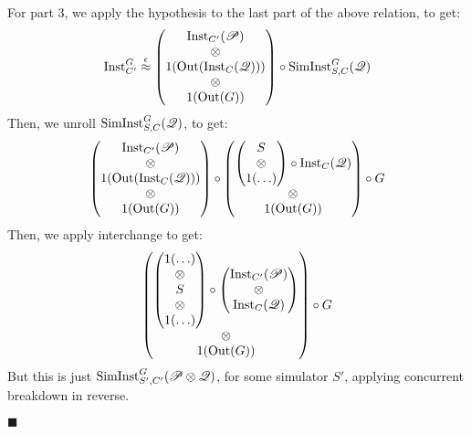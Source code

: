 \begin{theorem}
  For part 3, we apply the hypothesis to the last part of the above relation, to get:
  $$
  \text{Inst}^G_{C'} \overset{\epsilon}{\approx}
  \begin{pmatrix}
    \text{Inst}_{C'}(\mathscr{P})\cr
    \otimes\cr
    1(\text{Out}(\text{Inst}_C(\mathscr{Q})))\cr
    \otimes\cr
    1(\text{Out}(G))
  \end{pmatrix}
  \circ
  \text{SimInst}^G_{S, C}(\mathscr{Q})
  $$
  Then, we unroll $\text{SimInst}^G_{S, C}(\mathscr{Q})$, to get:
  $$
  \begin{pmatrix}
    \text{Inst}_{C'}(\mathscr{P})\cr
    \otimes\cr
    1(\text{Out}(\text{Inst}_C(\mathscr{Q})))\cr
    \otimes\cr
    1(\text{Out}(G))
  \end{pmatrix}
  \circ
  \begin{pmatrix}
    \begin{pmatrix}
      S\cr
      \otimes\cr
      1(\ldots)\cr
    \end{pmatrix}
    \circ \text{Inst}_C(\mathscr{Q})\cr
    \otimes\cr
    1(\text{Out}(G))
  \end{pmatrix}
  \circ G
  $$
  Then, we apply interchange to get:
  $$
  \begin{pmatrix}
    \begin{pmatrix}
      1(\ldots)\cr
      \otimes\cr
      S\cr
      \otimes\cr
      1(\ldots)\cr
    \end{pmatrix}
    \circ
    \begin{pmatrix}
    \text{Inst}_{C'}(\mathscr{P})\cr
    \otimes\cr
    \text{Inst}_C(\mathscr{Q})\cr
    \end{pmatrix}\cr
    \otimes\cr
    1(\text{Out}(G))
  \end{pmatrix}
  \circ G
  $$
  But this is just $\text{SimInst}^G_{S', C'}(\mathscr{P} \otimes \mathscr{Q})$,
  for some simulator $S'$,
  applying concurrent breakdown in reverse.

  $\blacksquare$
\end{theorem}

